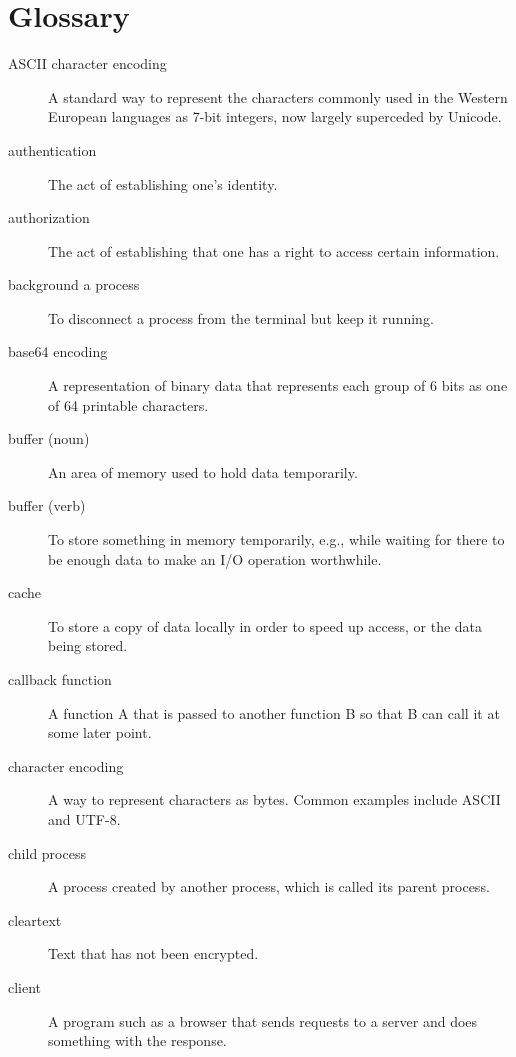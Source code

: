 \documentclass[krantzl]{krantz}
\begin{document}
\chapter{Glossary}\label{glossary}



\begin{description}

\item[ASCII character encoding] A standard way to represent the characters commonly used in the Western European languages as 7-bit integers, now largely superceded by Unicode.

\item[authentication] The act of establishing one’s identity.

\item[authorization] The act of establishing that one has a right to access certain information.

\item[background a process] To disconnect a process from the terminal but keep it running.

\item[base64 encoding] A representation of binary data that represents each group of 6 bits as one of 64 printable characters.

\item[buffer (noun)] An area of memory used to hold data temporarily.

\item[buffer (verb)] To store something in memory temporarily, e.g., while waiting for there to be enough data to make an I/O operation worthwhile.

\item[cache] To store a copy of data locally in order to speed up access, or the data being stored.

\item[callback function] A function A that is passed to another function B so that B can call it at some later point.

\item[character encoding] A way to represent characters as bytes. Common examples include ASCII and UTF-8.

\item[child process] A process created by another process, which is called its parent process.

\item[cleartext] Text that has not been encrypted.

\item[client] A program such as a browser that sends requests to a server and does something with the response.


\end{description}
\end{document}
